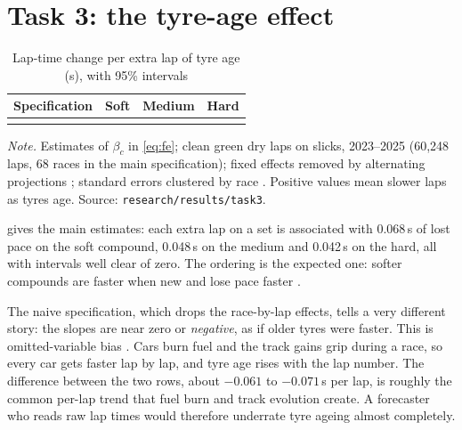 \documentclass[12pt]{article}
\begin{document}
\section{Task 3: the tyre-age effect}\label{sec:t3}

\begin{table}[htbp]
\centering
\caption{Lap-time change per extra lap of tyre age (s), with 95\% intervals}\label{tab:t3}
\begin{threeparttable}
\footnotesize
\begin{tabularx}{\textwidth}{>{\raggedright\arraybackslash}p{4.4cm}LLL}
\toprule
Specification & Soft & Medium & Hard\\
\midrule
{}
\bottomrule
\end{tabularx}
\begin{tablenotes}\footnotesize
\item \textit{Note.} Estimates of $\beta_c$ in \cref{eq:fe}; clean green dry laps on slicks, 2023--2025 (60,248 laps,
68 races in the main specification); fixed effects removed by alternating projections
\parencite{guimaraes2010,gaure2013}; standard errors clustered by race \parencite{cameron2015}. Positive values mean slower
laps as tyres age. Source: \texttt{research/results/task3}.
\end{tablenotes}
\end{threeparttable}
\end{table}

 gives the main estimates: each extra lap on a set is associated with 0.068\,s of lost pace on the soft
compound, 0.048\,s on the medium and 0.042\,s on the hard, all with intervals well clear of zero. The ordering is the
expected one: softer compounds are faster when new and lose pace faster \parencite{pirelli_tyres}.

The naive specification, which drops the race-by-lap effects, tells a very different story: the slopes are near zero or
\emph{negative}, as if older tyres were faster. This is omitted-variable bias \parencite{angrist2009}. Cars burn fuel
and the track gains grip during a race, so every car gets faster lap by lap, and tyre age rises with the lap number.
The difference between the two rows, about $-0.061$ to $-0.071$\,s per lap, is roughly the common per-lap trend that
fuel burn and track evolution create. A forecaster who reads raw lap times would therefore underrate tyre ageing almost
completely.
\end{document}
